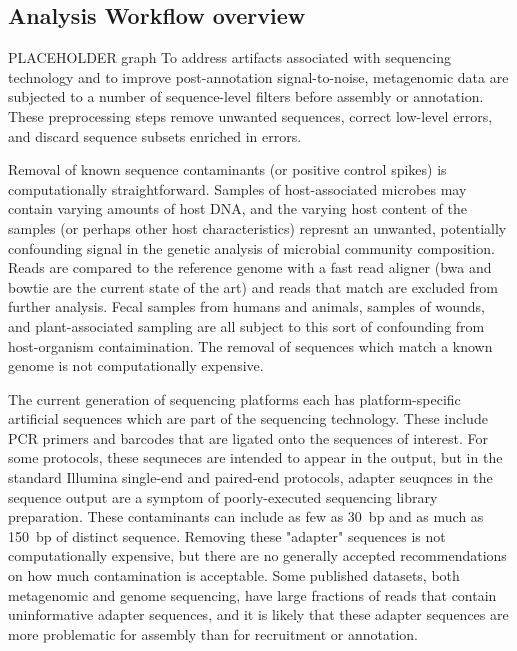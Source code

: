 \documentclass[graybox]{svmult}
\begin{document}
\subsection{Analysis Workflow overview}
PLACEHOLDER graph
        To address artifacts associated with sequencing technology and to improve post-annotation signal-to-noise, metagenomic data are subjected to a number of sequence-level filters before assembly or annotation.  These preprocessing steps remove unwanted sequences, correct low-level errors, and discard sequence subsets enriched in errors.

        Removal of known sequence contaminants (or positive control spikes) is computationally straightforward.   Samples of host-associated microbes may contain varying amounts of host DNA, and the varying host content of the samples (or perhaps other host characteristics) represnt an unwanted, potentially confounding signal in the genetic analysis of microbial community composition.  Reads are compared to the reference genome with a fast read aligner (bwa and bowtie are the current state of the art) and reads that match are excluded from further analysis.   Fecal samples from humans and animals, samples of wounds, and plant-associated sampling are all subject to this sort of confounding from host-organism contaimination.  The removal of sequences which match a known genome is not computationally expensive.

        The current generation of sequencing platforms each has platform-specific artificial sequences which are part of the sequencing technology.  These include PCR primers and barcodes that are ligated onto the sequences of interest.
For some protocols, these sequneces are intended to appear in the output, but in the standard Illumina single-end and paired-end protocols, adapter seuqnces in the sequence output are a symptom of poorly-executed sequencing library preparation.
These contaminants can include as few as 30~bp and as much as 150~bp of distinct sequence.   Removing these "adapter" sequences is not computationally expensive, but there are no generally accepted recommendations on how much contamination is acceptable.
Some published datasets, both metagenomic and genome sequencing, have large fractions of reads that contain uninformative adapter sequences, and it is likely that these adapter sequences are more problematic for assembly than for recruitment or annotation.
\end{document}

